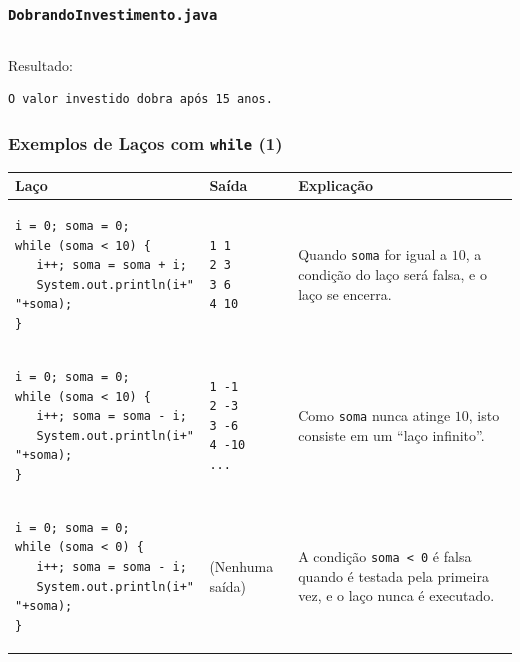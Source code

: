 \documentclass[xcolor={dvipsnames,table},aspectratio=169]{beamer}
\begin{document}
\begin{frame}[fragile]\frametitle{\texttt{DobrandoInvestimento.java}}
\tiny{\inputminted[bgcolor=cyan!10]{java}{src/DobrandoInvestimento.java}}
{\tiny
Resultado:
\begin{verbatim}
O valor investido dobra após 15 anos.
\end{verbatim}
}
\end{frame}

\begin{frame}[fragile]\frametitle{Exemplos de Laços com \texttt{while} (1)}
{\scriptsize
\begin{center}
  \begin{tabular}{|p{6cm}|p{2cm}|p{5cm}|}
\hline
    \textbf{Laço} & \textbf{Saída} & \textbf{Explicação} \\
\hline
{\tiny
\begin{verbatim}
i = 0; soma = 0;
while (soma < 10) {
   i++; soma = soma + i;
   System.out.println(i+" "+soma);
}
\end{verbatim}
}
&
{\tiny
\begin{verbatim}
1 1
2 3
3 6
4 10
\end{verbatim}
}
& Quando \texttt{soma} for igual a $10$, a condição do laço será falsa, e o laço se encerra.\\
\hline
{\tiny
\begin{verbatim}
i = 0; soma = 0;
while (soma < 10) {
   i++; soma = soma - i;
   System.out.println(i+" "+soma);
}
\end{verbatim}
}
&
{\tiny
\begin{verbatim}
1 -1
2 -3
3 -6
4 -10
...
\end{verbatim}
}
& Como \texttt{soma} nunca atinge $10$, isto consiste em um ``laço infinito''.\\
\hline
{\tiny
\begin{verbatim}
i = 0; soma = 0;
while (soma < 0) {
   i++; soma = soma - i;
   System.out.println(i+" "+soma);
}
\end{verbatim}
}
&
(Nenhuma saída)
& A condição \texttt{soma < 0} é falsa quando é testada pela primeira vez, e o laço nunca é executado.\\
\hline
  \end{tabular}
\end{center}
}
\end{frame}
\end{document}
